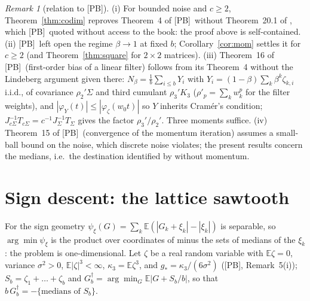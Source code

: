 \documentclass[10pt]{article}
\theoremstyle{definition}
\theoremstyle{remark}
\newtheorem{remark}[theorem]{Remark}
\newcommand{\E}{\mathbb{E}}
\newcommand{\st}{\dagger}
\newcommand{\PB}{\textup{[PB]}}
\begin{document}
\begin{remark}[relation to \PB]\label{rem:pb}
(i) For bounded noise and $c\ge2$, Theorem~\ref{thm:codim} reproves Theorem~4 of \PB\ without Theorem~20.1 of \cite{br},
which \PB\ quoted without access to the book: the proof above is self-contained. (ii) \PB\ left open the regime
$\beta\to1$ at fixed $b$; Corollary~\ref{cor:mom} settles it for $c\ge2$ (and Theorem~\ref{thm:square} for $2\times2$
matrices). (iii) Theorem~16 of \PB\ (first-order bias of a linear filter) follows from its Theorem~4 without the
Lindeberg argument given there: $N_\beta=\frac1b\sum_{i\le b}Y_i$ with $Y_i=(1-\beta)\sum_k\beta^k\zeta_{k,i}$ i.i.d., of
covariance $\rho_2'\Sigma$ and third cumulant $\rho_3'K_3$ ($\rho'_p=\sum_kw_k^p$ for the filter weights), and
$|\varphi_Y(t)|\le|\varphi_\zeta(w_0t)|$ so $Y$ inherits Cram\'er's condition; $J_{c\Sigma}^{-1}T_{c\Sigma}=c^{-1}J_\Sigma^{-1}T_\Sigma$
gives the factor $\rho_3'/\rho_2'$. Three moments suffice. (iv) Theorem~15 of \PB\ (convergence of the momentum
iteration) assumes a small-ball bound on the noise, which discrete noise violates; the present results concern the
medians, i.e.\ the destination identified by \cite[Theorem~2]{manuscript} without momentum.
\end{remark}

\section{Sign descent: the lattice sawtooth}\label{sec:sign}

For the sign geometry $\psi_\xi(G)=\sum_k\E(|G_k+\xi_k|-|\xi_k|)$ is separable, so $\arg\min\psi_\xi$ is the product over
coordinates of minus the sets of medians of the $\xi_k$: the problem is one-dimensional. Let $\zeta$ be a real random
variable with $\E\zeta=0$, variance $\sigma^2>0$, $\E|\zeta|^3<\infty$, $\kappa_3=\E\zeta^3$, and
$g_\ast=\kappa_3/(6\sigma^2)$ (\PB, Remark~5(i)); $S_b=\zeta_1+\dots+\zeta_b$ and $G_b^\st=\arg\min_G\E|G+S_b/b|$, so
that $b\,G^\st_b=-\{\text{medians of }S_b\}$.
\end{document}
